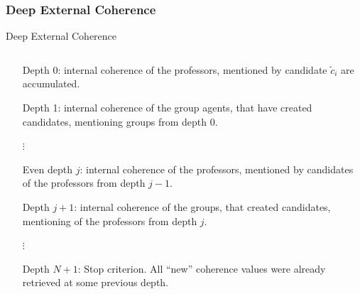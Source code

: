 \documentclass{beamer}
\providecommand{\rootdir}{../doc}
\begin{document}
\subsubsection{Deep External Coherence}

\begin{frame}{Deep External Coherence}
  \begin{columns}
    \begin{column}{.8\textwidth}
      \begin{itemize}
        \item[Depth 0:] internal coherence of the professors,
                  mentioned by candidate $\tilde{c}_i$ are accumulated.
        \item[Depth 1:] internal coherence of the group agents,
                  that have created candidates, mentioning groups from depth 0.
        \item[$\vdots$]
        \item[Even depth $j$:] internal coherence of the professors,
                  mentioned by candidates of the professors from depth $j-1$.
        \item[Depth $j+1$:] internal coherence of the groups,
                  that created candidates, mentioning of the professors from depth $j$.
        \item[$\vdots$]
        \item[Depth $N+1$:] Stop criterion.
                  All ``new'' coherence values were already retrieved at some previous depth.
      \end{itemize}
    \end{column}
  \end{columns}
\end{frame}



\end{document}
